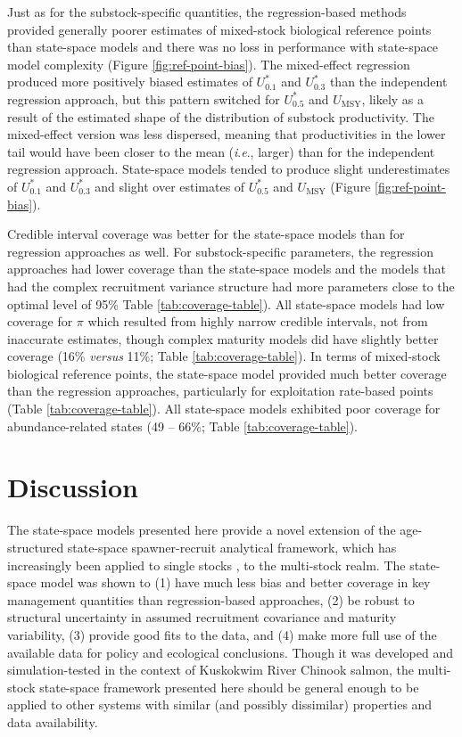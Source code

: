 \documentclass[12pt,]{book}
\theoremstyle{definition}
\theoremstyle{definition}
\theoremstyle{definition}
\theoremstyle{remark}
\begin{document}
Just as for the substock-specific quantities, the regression-based
methods provided generally poorer estimates of mixed-stock biological
reference points than state-space models and there was no loss in
performance with state-space model complexity (Figure
\ref{fig:ref-point-bias}). The mixed-effect regression produced more
positively biased estimates of \(U^*_{0.1}\) and \(U^*_{0.3}\) than the
independent regression approach, but this pattern switched for
\(U^*_{0.5}\) and \(U_{\text{MSY}}\), likely as a result of the
estimated shape of the distribution of substock productivity. The
mixed-effect version was less dispersed, meaning that productivities in
the lower tail would have been closer to the mean (\emph{i}.\emph{e}.,
larger) than for the independent regression approach. State-space models
tended to produce slight underestimates of \(U^*_{0.1}\) and
\(U^*_{0.3}\) and slight over estimates of \(U^*_{0.5}\) and
\(U_{\text{MSY}}\) (Figure \ref{fig:ref-point-bias}).

Credible interval coverage was better for the state-space models than
for regression approaches as well. For substock-specific parameters, the
regression approaches had lower coverage than the state-space models and
the models that had the complex recruitment variance structure had more
parameters close to the optimal level of 95\% Table
\ref{tab:coverage-table}). All state-space models had low coverage for
\(\pi\) which resulted from highly narrow credible intervals, not from
inaccurate estimates, though complex maturity models did have slightly
better coverage (16\% \emph{versus} 11\%; Table
\ref{tab:coverage-table}). In terms of mixed-stock biological reference
points, the state-space model provided much better coverage than the
regression approaches, particularly for exploitation rate-based points
(Table \ref{tab:coverage-table}). All state-space models exhibited poor
coverage for abundance-related states (49 -- 66\%; Table
\ref{tab:coverage-table}).

\section{Discussion}\label{discussion-2}

\noindent
The state-space models presented here provide a novel extension of the
age-structured state-space spawner-recruit analytical framework, which
has increasingly been applied to single stocks
\citep[\emph{e}.\emph{g}.,][]{su-peterman-2012, hamazaki-etal-2012, fleischman-etal-2013, staton-etal-2017-intseq, defilippo-etal-2018},
to the multi-stock realm. The state-space model was shown to (1) have
much less bias and better coverage in key management quantities than
regression-based approaches, (2) be robust to structural uncertainty in
assumed recruitment covariance and maturity variability, (3) provide
good fits to the data, and (4) make more full use of the available data
for policy and ecological conclusions. Though it was developed and
simulation-tested in the context of Kuskokwim River Chinook salmon, the
multi-stock state-space framework presented here should be general
enough to be applied to other systems with similar (and possibly
dissimilar) properties and data availability.
\end{document}
